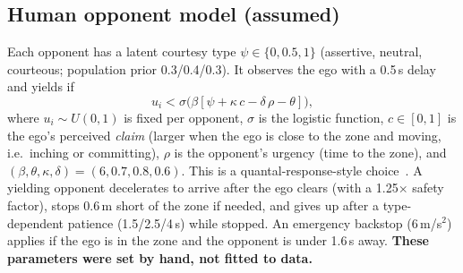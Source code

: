 \documentclass[11pt,a4paper]{article}
\begin{document}
\subsection{Human opponent model (assumed)}
Each opponent has a latent courtesy type $\psi\in\{0,0.5,1\}$ (assertive, neutral, courteous; population prior 0.3/0.4/0.3). It observes the ego with a 0.5\,s delay and yields if
\begin{equation}
u_i<\sigma\!\big(\beta[\psi+\kappa\,c-\delta\,\rho-\theta]\big),
\end{equation}
where $u_i\sim U(0,1)$ is fixed per opponent, $\sigma$ is the logistic function, $c\in[0,1]$ is the ego's perceived \emph{claim} (larger when the ego is close to the zone and moving, i.e.\ inching or committing), $\rho$ is the opponent's urgency (time to the zone), and $(\beta,\theta,\kappa,\delta)=(6,0.7,0.8,0.6)$. This is a quantal-response-style choice~\cite{qre}. A yielding opponent decelerates to arrive after the ego clears (with a 1.25$\times$ safety factor), stops 0.6\,m short of the zone if needed, and gives up after a type-dependent patience (1.5/2.5/4\,s) while stopped. An emergency backstop (6\,m/s$^2$) applies if the ego is in the zone and the opponent is under 1.6\,s away. \textbf{These parameters were set by hand, not fitted to data.}
\end{document}
